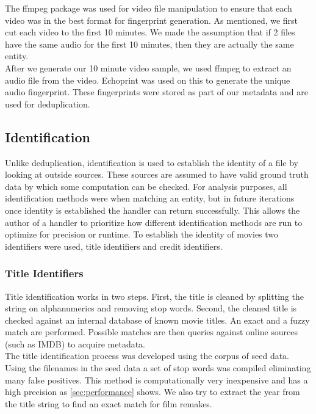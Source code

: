 \documentclass[paper=a4, fontsize=11pt]{scrartcl} %
\numberwithin{equation}{section} %
\numberwithin{figure}{section} %
\numberwithin{table}{section} %
\begin{document}
The ffmpeg package was used for video file manipulation to ensure that each video was in the best format for fingerprint generation. As mentioned, we first cut each video to the first 10 minutes. We made the assumption that if 2 files have the same audio for the first 10 minutes, then they are actually the same entity. \\

After we generate our 10 minute video sample, we used ffmpeg to extract an audio file from the video. Echoprint was used on this to generate the unique audio fingerprint. These fingerprints were stored as part of our metadata and are used for deduplication.  \\



\subsection{Identification}
\label{sec:identification}
Unlike deduplication, identification is used to establish the identity of a file by looking at outside sources. These sources are assumed to have valid ground truth data by which some computation can be checked. For analysis purposes, all identification methods were when matching an entity, but in future iterations once identity is established the handler can return successfully. This allows the author of a handler to prioritize how different identification methods are run to optimize for precision or runtime. To establish the identity of movies two identifiers were used, title identifiers and credit identifiers. \\

\subsubsection{Title Identifiers}
\label{sec:title-identifier}

Title identification works in two steps. First, the title is cleaned by splitting the string on alphanumerics and removing stop words. Second, the cleaned title is checked against an internal database of known movie titles. An exact and a fuzzy match are performed. Possible matches are then queries against online sources (such as IMDB) to acquire metadata. \\

The title identification process was developed using the corpus of seed data. Using the filenames in the seed data a set of stop words was compiled eliminating many false positives. This method is computationally very inexpensive and has a high precision as \ref{sec:performance} shows. We also try to extract the year from the title string to find an exact match for film remakes. \\
\end{document}
